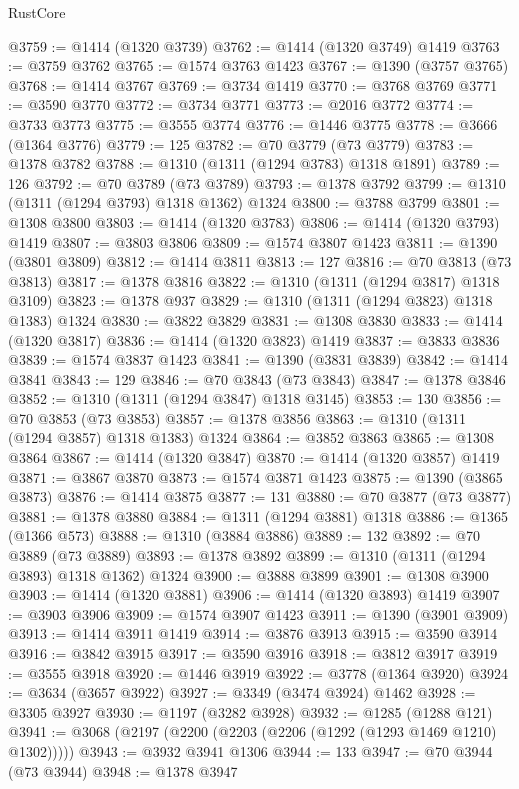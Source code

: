 \begin{lexlean}{RustCore}
\begin{coremodule}
@3759 := @1414 (@1320 @3739)
@3762 := @1414 (@1320 @3749) @1419
@3763 := @3759 @3762
@3765 := @1574 @3763 @1423
@3767 := @1390 (@3757 @3765)
@3768 := @1414 @3767
@3769 := @3734 @1419
@3770 := @3768 @3769
@3771 := @3590 @3770
@3772 := @3734 @3771
@3773 := @2016 @3772
@3774 := @3733 @3773
@3775 := @3555 @3774
@3776 := @1446 @3775
@3778 := @3666 (@1364 @3776)
@3779 := 125
@3782 := @70 @3779 (@73 @3779)
@3783 := @1378 @3782
@3788 := @1310 (@1311 (@1294 @3783) @1318 @1891)
@3789 := 126
@3792 := @70 @3789 (@73 @3789)
@3793 := @1378 @3792
@3799 := @1310 (@1311 (@1294 @3793) @1318 @1362) @1324
@3800 := @3788 @3799
@3801 := @1308 @3800
@3803 := @1414 (@1320 @3783)
@3806 := @1414 (@1320 @3793) @1419
@3807 := @3803 @3806
@3809 := @1574 @3807 @1423
@3811 := @1390 (@3801 @3809)
@3812 := @1414 @3811
@3813 := 127
@3816 := @70 @3813 (@73 @3813)
@3817 := @1378 @3816
@3822 := @1310 (@1311 (@1294 @3817) @1318 @3109)
@3823 := @1378 @937
@3829 := @1310 (@1311 (@1294 @3823) @1318 @1383) @1324
@3830 := @3822 @3829
@3831 := @1308 @3830
@3833 := @1414 (@1320 @3817)
@3836 := @1414 (@1320 @3823) @1419
@3837 := @3833 @3836
@3839 := @1574 @3837 @1423
@3841 := @1390 (@3831 @3839)
@3842 := @1414 @3841
@3843 := 129
@3846 := @70 @3843 (@73 @3843)
@3847 := @1378 @3846
@3852 := @1310 (@1311 (@1294 @3847) @1318 @3145)
@3853 := 130
@3856 := @70 @3853 (@73 @3853)
@3857 := @1378 @3856
@3863 := @1310 (@1311 (@1294 @3857) @1318 @1383) @1324
@3864 := @3852 @3863
@3865 := @1308 @3864
@3867 := @1414 (@1320 @3847)
@3870 := @1414 (@1320 @3857) @1419
@3871 := @3867 @3870
@3873 := @1574 @3871 @1423
@3875 := @1390 (@3865 @3873)
@3876 := @1414 @3875
@3877 := 131
@3880 := @70 @3877 (@73 @3877)
@3881 := @1378 @3880
@3884 := @1311 (@1294 @3881) @1318
@3886 := @1365 (@1366 @573)
@3888 := @1310 (@3884 @3886)
@3889 := 132
@3892 := @70 @3889 (@73 @3889)
@3893 := @1378 @3892
@3899 := @1310 (@1311 (@1294 @3893) @1318 @1362) @1324
@3900 := @3888 @3899
@3901 := @1308 @3900
@3903 := @1414 (@1320 @3881)
@3906 := @1414 (@1320 @3893) @1419
@3907 := @3903 @3906
@3909 := @1574 @3907 @1423
@3911 := @1390 (@3901 @3909)
@3913 := @1414 @3911 @1419
@3914 := @3876 @3913
@3915 := @3590 @3914
@3916 := @3842 @3915
@3917 := @3590 @3916
@3918 := @3812 @3917
@3919 := @3555 @3918
@3920 := @1446 @3919
@3922 := @3778 (@1364 @3920)
@3924 := @3634 (@3657 @3922)
@3927 := @3349 (@3474 @3924) @1462
@3928 := @3305 @3927
@3930 := @1197 (@3282 @3928)
@3932 := @1285 (@1288 @121)
@3941 := @3068 (@2197 (@2200 (@2203 (@2206 (@1292 (@1293 @1469 @1210) @1302)))))
@3943 := @3932 @3941 @1306
@3944 := 133
@3947 := @70 @3944 (@73 @3944)
@3948 := @1378 @3947

\end{coremodule}
\end{lexlean}
